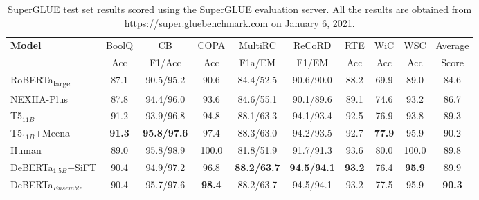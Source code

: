 \begin{table}[htb!]
    \centering
    \begin{tabular}{@{\hskip2pt}l@{\hskip2pt}|@{\hskip2pt} @{\hskip1pt}c@{\hskip1pt}|@{\hskip2pt}c@{\hskip1pt}|@{\hskip2pt}c@{\hskip1pt}|c@{\hskip1pt}|c@{\hskip1pt}|c@{\hskip1pt}|c@{\hskip1pt}|c@{\hskip1pt}|@{\hskip2pt}c@{\hskip1pt}}
        \toprule
        \multirow{2}{*}{\bf Model} & BoolQ &CB&COPA&MultiRC&ReCoRD&RTE&WiC&WSC& Average\\ 
         & Acc & F1/Acc & Acc &F1a/EM&F1/EM&Acc&Acc&Acc& Score\\
        \midrule
        RoBERTa\textsubscript{large} & 87.1  & 90.5/95.2 & 90.6 &84.4/52.5&90.6/90.0&88.2&69.9 &89.0 &84.6\\  \hline
        NEXHA-Plus                  & 87.8  & 94.4/96.0 & 93.6 &84.6/55.1&90.1/89.6&89.1&74.6 &93.2 &86.7\\  \hline
        T5$_{11B}$ &91.2  & 93.9/96.8 & 94.8 &88.1/63.3&94.1/93.4&92.5&76.9 &93.8 &89.3\\ 
        \hline
        T5$_{11B}$+Meena &\textbf{91.3}  & \textbf{95.8/97.6} & 97.4 &88.3/63.0&94.2/93.5&92.7&\textbf{77.9} &95.9 &90.2\\ 
        \hline \hline
        Human  &89.0 & 95.8/98.9 & 100.0 &81.8/51.9&91.7/91.3&93.6&80.0 &100.0 &89.8\\  \hline \hline
        DeBERTa$_{1.5B}$+SiFT &90.4  & 94.9/97.2 & 96.8&\textbf{88.2/63.7}&\textbf{94.5/94.1}&\textbf{93.2}&76.4 &	\textbf{95.9} & 89.9\\  
        DeBERTa$_{Ensemble}$ &90.4  & 95.7/97.6 & \textbf{98.4}&88.2/63.7&94.5/94.1&93.2&77.5 &	95.9 & \textbf{90.3}\\
        \bottomrule
        \end{tabular}
    \caption{
    SuperGLUE test set results scored using the SuperGLUE evaluation server. All the results are obtained from \href{https://super.gluebenchmark.com}{https://super.gluebenchmark.com} on January 6, 2021.
    }
    \label{tab:superglue}
    
\end{table}

